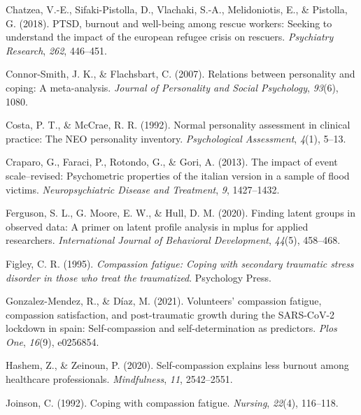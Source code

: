 \documentclass[
  man]{apa7}
\newlength{\cslhangindent}
\newlength{\cslentryspacingunit} %
\newenvironment{CSLReferences}[2] %
 {%
  \setlength{\parindent}{0pt}
  \ifodd #1
  \let\oldpar\par
  \def\par{\hangindent=\cslhangindent\oldpar}
  \fi
  \setlength{\parskip}{#2\cslentryspacingunit}
 }%
 {}
\begin{document}
\begin{CSLReferences}{1}{0}
\leavevmode{}%
Chatzea, V.-E., Sifaki-Pistolla, D., Vlachaki, S.-A., Melidoniotis, E., \& Pistolla, G. (2018). PTSD, burnout and well-being among rescue workers: Seeking to understand the impact of the european refugee crisis on rescuers. \emph{Psychiatry Research}, \emph{262}, 446--451.

\leavevmode{}%
Connor-Smith, J. K., \& Flachsbart, C. (2007). Relations between personality and coping: A meta-analysis. \emph{Journal of Personality and Social Psychology}, \emph{93}(6), 1080.

\leavevmode{}%
Costa, P. T., \& McCrae, R. R. (1992). Normal personality assessment in clinical practice: The NEO personality inventory. \emph{Psychological Assessment}, \emph{4}(1), 5--13.

\leavevmode{}%
Craparo, G., Faraci, P., Rotondo, G., \& Gori, A. (2013). The impact of event scale--revised: Psychometric properties of the italian version in a sample of flood victims. \emph{Neuropsychiatric Disease and Treatment}, \emph{9}, 1427--1432.

\leavevmode{}%
Ferguson, S. L., G. Moore, E. W., \& Hull, D. M. (2020). Finding latent groups in observed data: A primer on latent profile analysis in mplus for applied researchers. \emph{International Journal of Behavioral Development}, \emph{44}(5), 458--468.

\leavevmode{}%
Figley, C. R. (1995). \emph{Compassion fatigue: Coping with secondary traumatic stress disorder in those who treat the traumatized}. Psychology Press.

\leavevmode{}%
Gonzalez-Mendez, R., \& Díaz, M. (2021). Volunteers' compassion fatigue, compassion satisfaction, and post-traumatic growth during the SARS-CoV-2 lockdown in spain: Self-compassion and self-determination as predictors. \emph{Plos One}, \emph{16}(9), e0256854.

\leavevmode{}%
Hashem, Z., \& Zeinoun, P. (2020). Self-compassion explains less burnout among healthcare professionals. \emph{Mindfulness}, \emph{11}, 2542--2551.

\leavevmode{}%
Joinson, C. (1992). Coping with compassion fatigue. \emph{Nursing}, \emph{22}(4), 116--118.


\end{CSLReferences}
\end{document}
